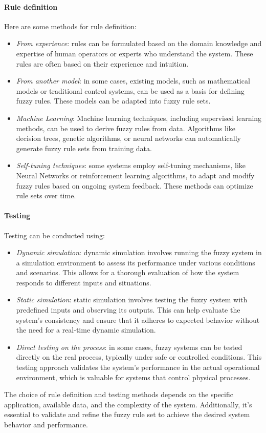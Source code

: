 \paragraph*{Rule definition}
Here are some methods for rule definition: 
\begin{itemize}
    \item \textit{From experience}: rules can be formulated based on the domain knowledge and expertise of human operators or experts who understand the system. 
        These rules are often based on their experience and intuition.
    \item \textit{From another model}: in some cases, existing models, such as mathematical models or traditional control systems, can be used as a basis for defining fuzzy rules.
        These models can be adapted into fuzzy rule sets.
    \item \textit{Machine Learning}: Machine learning techniques, including supervised learning methods, can be used to derive fuzzy rules from data. 
        Algorithms like decision trees, genetic algorithms, or neural networks can automatically generate fuzzy rule sets from training data.
    \item \textit{Self-tuning techniques}: some systems employ self-tuning mechanisms, like Neural Networks or reinforcement learning algorithms, to adapt and modify fuzzy rules based on ongoing system feedback. 
        These methods can optimize rule sets over time.
\end{itemize}

\paragraph*{Testing}
Testing can be conducted using:
\begin{itemize}
    \item \textit{Dynamic simulation}: dynamic simulation involves running the fuzzy system in a simulation environment to assess its performance under various conditions and scenarios. 
        This allows for a thorough evaluation of how the system responds to different inputs and situations.
    \item \textit{Static simulation}: static simulation involves testing the fuzzy system with predefined inputs and observing its outputs. 
        This can help evaluate the system's consistency and ensure that it adheres to expected behavior without the need for a real-time dynamic simulation.
    \item \textit{Direct testing on the process}: in some cases, fuzzy systems can be tested directly on the real process, typically under safe or controlled conditions. 
        This testing approach validates the system's performance in the actual operational environment, which is valuable for systems that control physical processes.
\end{itemize}
The choice of rule definition and testing methods depends on the specific application, available data, and the complexity of the system. 
Additionally, it's essential to validate and refine the fuzzy rule set to achieve the desired system behavior and performance.